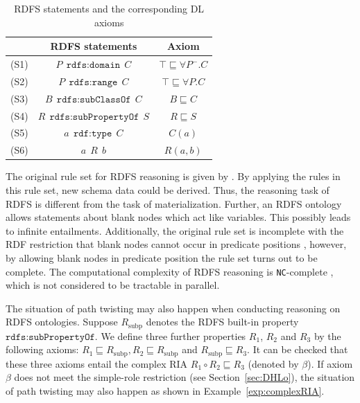 \begin{table}
\centering
\caption{RDFS statements and the corresponding DL axioms}
{\setlength{\tabcolsep}{6mm}
\begin{tabular}{lcc}
\hline
& RDFS statements & Axiom\\
\hline
\hline
(S1)&$P~~\texttt{rdfs:domain}~~C$& $\top\sqsubseteq\forall P^-.C$\\

(S2)&$P~~\texttt{rdfs:range}~~C$& $\top\sqsubseteq\forall P.C$\\

(S3)&$B~~\texttt{rdfs:subClassOf}~~C$& $B\sqsubseteq C$\\

(S4)&$R~~\texttt{rdfs:subPropertyOf}~~S$& $R\sqsubseteq S$\\
\hline
(S5)&$a~~\texttt{rdf:type}~~C$& $C(a)$\\

(S6)&$a~~R~~b$& $R(a,b)$\\
\hline
\end{tabular}}
\label{tab:rdfs}
\end{table}




The original rule set for RDFS reasoning is
given by \citet{RDFSrec04}. By applying the rules in this rule set,
new schema data could be derived. Thus, the reasoning task of RDFS
is different from the task of materialization. Further, an RDFS ontology allows
statements about blank nodes which act like variables. This possibly
leads to infinite entailments. Additionally, the original rule set is
incomplete with the RDF restriction that
blank nodes cannot occur in predicate positions \cite{Horst05},
however, by allowing blank nodes in predicate position
the rule set turns out to be complete. The computational complexity
of RDFS reasoning is \texttt{NC}-complete \cite{Horst05},
which is not considered to be tractable in parallel.

The situation of path twisting may also happen when conducting reasoning
on RDFS ontologies. Suppose $R_{\text{subp}}$ denotes the RDFS built-in property $\texttt{rdfs:subPropertyOf}$.
We define three further properties $R_1$, $R_2$ and $R_3$ by the following axioms:
$R_1\sqsubseteq R_{\text{subp}}, R_2\sqsubseteq R_{\text{subp}}$ and $R_{\text{subp}}\sqsubseteq R_3$.
It can be checked that these three axioms entail the complex RIA $R_1\circ R_2\sqsubseteq R_3$ (denoted by $\beta$).
If axiom $\beta$ does not meet the simple-role restriction (see Section~\ref{sec:DHLo}),
the situation of path twisting may also happen as shown in Example~\ref{exp:complexRIA}.

